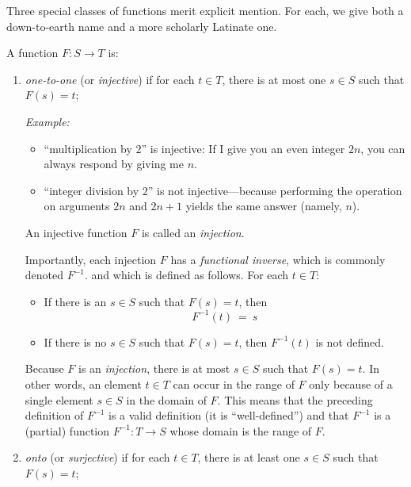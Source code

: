 Three special classes of functions merit explicit mention.  For each,
we give both a down-to-earth name and a more scholarly Latinate one.

A function $F: S \rightarrow T$ is:
\begin{enumerate}
\item
{\it one-to-one} (or {\it injective}) if for each $t \in T$, there is
at most one $s \in S$ such that $F(s) = t$;

\medskip

{\em Example:}
\begin{itemize}
\item
 ``multiplication by $2$'' is injective:  If I give you an even
  integer $2n$, you can always respond by giving me $n$.
\item
``integer division by $2$'' is not injective---because performing the
  operation on arguments $2n$ and $2n+1$ yields the same answer
  (namely, $n$).
\end{itemize}

An injective function $F$ is called an {\it injection}.

\smallskip

Importantly, each injection $F$ has a {\it functional inverse},
%
which is commonly denoted $F^{-1}$.
%
and which is defined as follows.  For each $t \in T$:
  \begin{itemize}
  \item
If there is an $s \in S$ such that $F(s) = t$, then
\[ F^{-1}(t) \ = \ s \]

  \item
If there is no $s \in S$ such that $F(s) = t$, then $F^{-1}(t)$ is not defined.
  \end{itemize}
Because $F$ is an {\em injection}, there is at most $s \in S$ such
that $F(s)= t$.  In other words, an element $t \in T$ can occur in the
range of $F$ only because of a single element $s \in S$ in the domain
of $F$.  This means that the preceding definition of $F^{-1}$ is a
valid definition (it is ``well-defined'') and that $F^{-1}$ is a
(partial) function $F^{-1}: T \rightarrow S$ whose domain is the range
of $F$.

\item
{\it onto} (or {\it surjective}) if for each $t \in T$, there is at
least one $s \in S$ such that $F(s) = t$;

\medskip


\end{enumerate}
